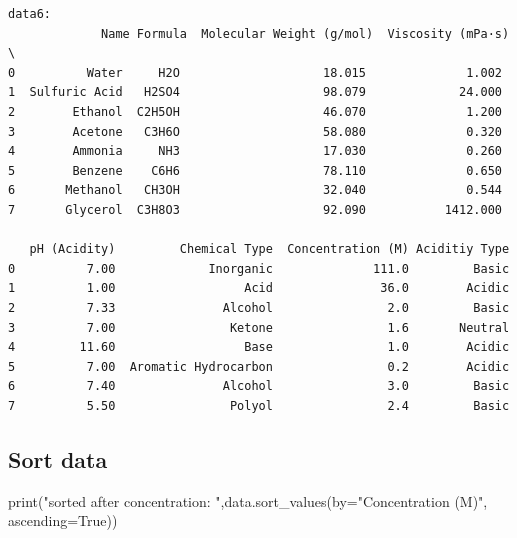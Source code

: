 \documentclass[
  letterpaper,
  DIV=11,
  numbers=noendperiod]{scrreprt}
\newenvironment{Shaded}{\begin{snugshade}}{\end{snugshade}}
\newcommand{\BuiltInTok}[1]{\textcolor[rgb]{0.00,0.23,0.31}{#1}}
\newcommand{\NormalTok}[1]{\textcolor[rgb]{0.00,0.23,0.31}{#1}}
\newcommand{\OperatorTok}[1]{\textcolor[rgb]{0.37,0.37,0.37}{#1}}
\newcommand{\StringTok}[1]{\textcolor[rgb]{0.13,0.47,0.30}{#1}}
\newcommand{\VariableTok}[1]{\textcolor[rgb]{0.07,0.07,0.07}{#1}}
\begin{document}
\begin{verbatim}
data6: 
             Name Formula  Molecular Weight (g/mol)  Viscosity (mPa·s)  \
0          Water     H2O                    18.015              1.002   
1  Sulfuric Acid   H2SO4                    98.079             24.000   
2        Ethanol  C2H5OH                    46.070              1.200   
3        Acetone   C3H6O                    58.080              0.320   
4        Ammonia     NH3                    17.030              0.260   
5        Benzene    C6H6                    78.110              0.650   
6       Methanol   CH3OH                    32.040              0.544   
7       Glycerol  C3H8O3                    92.090           1412.000   

   pH (Acidity)         Chemical Type  Concentration (M) Aciditiy Type  
0          7.00             Inorganic              111.0         Basic  
1          1.00                  Acid               36.0        Acidic  
2          7.33               Alcohol                2.0         Basic  
3          7.00                Ketone                1.6       Neutral  
4         11.60                  Base                1.0        Acidic  
5          7.00  Aromatic Hydrocarbon                0.2        Acidic  
6          7.40               Alcohol                3.0         Basic  
7          5.50                Polyol                2.4         Basic  
\end{verbatim}

\subsection{Sort data}\label{sort-data}

\begin{Shaded}
\begin{Highlighting}[]
\BuiltInTok{print}\NormalTok{(}\StringTok{"sorted after concentration: "}\NormalTok{,data.sort\_values(by}\OperatorTok{=}\StringTok{"Concentration (M)"}\NormalTok{, ascending}\OperatorTok{=}\VariableTok{True}\NormalTok{))}
\end{Highlighting}
\end{Shaded}
\end{document}
